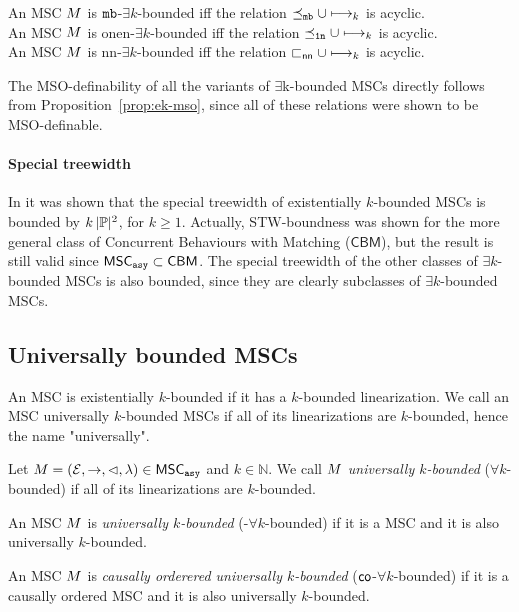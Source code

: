 \begin{proposition}\label{prop:ek-mso}
	An MSC $M$ is $\mathtt{mb}$-$\exists k$-bounded iff the relation $\preceq_{\mathtt{mb}} \cup \longmapsto_k$ is acyclic.\\
	An MSC $M$ is onen-$\exists k$-bounded iff the relation $\preceq_{\mathtt{1n}} \cup \longmapsto_k$ is acyclic.\\
	An MSC $M$ is nn-$\exists k$-bounded iff the relation $\sqsubset_{\mathsf{nn}} \cup \longmapsto_k$ is acyclic.
\end{proposition}

The MSO-definability of all the variants of $\exists$k-bounded MSCs directly follows from Proposition~\ref{prop:ek-mso}, since all of these relations were shown to be MSO-definable.

\paragraph*{Special treewidth}

In \cite[Lemma 5.37]{DBLP:journals/corr/abs-1904-06942} it was shown that the special treewidth of existentially $k$-bounded MSCs is bounded by $k\,|\mathbb{P}|^2$, for $k \ge 1$. Actually, STW-boundness was shown for the more general class of Concurrent Behaviours with Matching ($\mathsf{CBM}$), but the result is still valid since $\mathsf{MSC}_{\mathtt{asy}} \subset \mathsf{CBM}$. The special treewidth of the other classes of $\exists k$-bounded MSCs is also bounded, since they are clearly subclasses of $\exists k$-bounded MSCs.

\subsection{Universally bounded MSCs}

An MSC is existentially $k$-bounded if it has a $k$-bounded linearization. We call an MSC universally $k$-bounded MSCs if all of its linearizations are $k$-bounded, hence the name "universally".

\begin{definition}\label{def:uk_bounded_msc}
	Let $M = (\mathcal{E}, \rightarrow, \lhd, \lambda) \in \mathsf{MSC}_{\mathtt{asy}}$ and $k \in \mathbb{N}$. We call $M$ \emph{universally $k$-bounded} ($\forall k$-bounded) if all of its linearizations are $k$-bounded.
\end{definition}
\begin{definition}
	An MSC $M$ is \emph{\pp universally $k$-bounded} (\pp-$\forall k$-bounded) if it is a \pp MSC and it is also universally $k$-bounded.
\end{definition}
\begin{definition}
	An MSC $M$ is \emph{causally orderered universally $k$-bounded} ($\mathsf{co}$-$\forall k$-bounded) if it is a causally ordered MSC and it is also universally $k$-bounded.
\end{definition}


